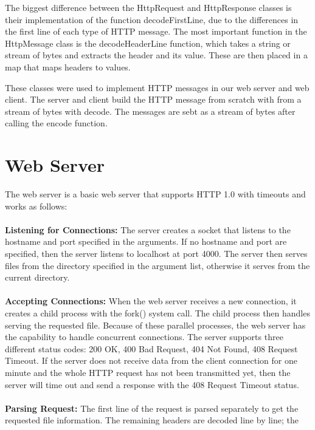 \documentclass{article}
\begin{document}
    The biggest difference between the HttpRequest and HttpResponse classes is
    their implementation of the function decodeFirstLine, due to the
    differences in the first line of each type of HTTP message. The most
    important function in the HttpMessage class is the decodeHeaderLine
    function, which takes a string or stream of bytes and extracts the header
    and its value. These are then placed in a map that maps headers to values.
    
    These classes were used to implement HTTP messages in our web server and
    web client. The server and client build the HTTP message from scratch with
    from a stream of bytes with decode. The messages are sebt as a stream of
    bytes after calling the encode function.

\section{Web Server}
    The web server is a basic web server that supports HTTP 1.0 with timeouts
    and works as follows: \\ \\
    \textbf{Listening for Connections:}
        The server creates a socket that listens to the hostname and port
        specified in the arguments. If no hostname and port are specified, then
        the server listens to localhost at port 4000. The server then serves
        files from the directory specified in the argument list, otherwise it
        serves from the current directory. \\ \\
    \textbf{Accepting Connections:}
        When the web server receives a new connection, it creates a child
        process with the fork() system call. The child process then handles
        serving the requested file. Because of these parallel processes, the
        web server has the capability to handle concurrent connections. The
        server supports three different status codes: 200 OK, 400 Bad Request,
        404 Not Found, 408 Request Timeout. If the server does not receive data
        from the client connection for one minute and the whole HTTP request
        has not been transmitted yet, then the server will time out and send a
        response with the 408 Request Timeout status. \\ \\
    \textbf{Parsing Request:}
        The first line of the request is parsed separately to get the requested
        file information. The remaining headers are decoded line by line; the
\end{document}
